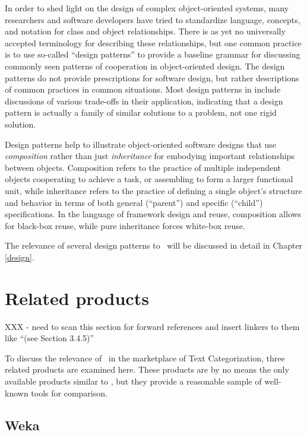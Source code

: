 In order to shed light on the design of complex object-oriented
systems, many researchers and software developers have tried to
standardize language, concepts, and notation for class and object
relationships.  There is as yet no universally accepted terminology
for describing these relationships, but one common practice is to use
so-called ``design patterns'' to provide a baseline grammar for
discussing commonly seen patterns of cooperation in object-oriented
design. \cite[p. 3]{gamma:95} The design patterns do not provide
prescriptions for software design, but rather descriptions of common
practices in common situations.  Most design patterns in
\cite{gamma:95} include discussions of various trade-offs in their
application, indicating that a design pattern is actually a family of
similar solutions to a problem, not one rigid solution.

Design patterns help to illustrate object-oriented software designs
that use \emph{composition} rather than just \emph{inheritance} for
embodying important relationships between objects.  Composition refers
to the practice of multiple independent objects cooperating to achieve
a task, or assembling to form a larger functional unit, while
inheritance refers to the practice of defining a single object's
structure and behavior in terms of both general (``parent'') and
specific (``child'') specifications.  In the language of framework
design and reuse, composition allows for black-box reuse, while pure
inheritance forces white-box reuse.\cite[p. 19]{gamma:95}

The relevance of several design patterns to \aicat\ will be discussed
in detail in Chapter \ref{design}.

\section{Related products}

XXX - need to scan this section for forward references and insert
linkers to them like ``(see Section 3.4.5)''

To discuss the relevance of \aicat\ in the marketplace of Text
Categorization, three related products are examined here.  These
products are by no means the only available products similar to
\aicat, but they provide a reasonable sample of well-known tools for
comparison.

\subsection{Weka}

